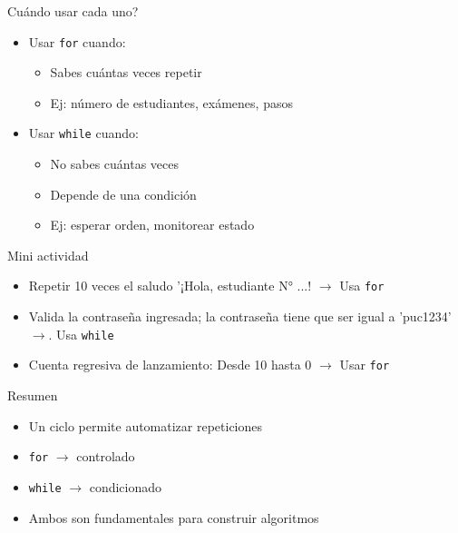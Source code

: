 \documentclass{beamer}
\begin{document}
    \begin{frame}{Cuándo usar cada uno?}
        \begin{itemize}
            \item Usar \texttt{for} cuando:
            \begin{itemize}
                \item Sabes cuántas veces repetir
                \item Ej: número de estudiantes, exámenes, pasos
            \end{itemize}
            \item Usar \texttt{while} cuando:
            \begin{itemize}
                \item No sabes cuántas veces
                \item Depende de una condición
                \item Ej: esperar orden, monitorear estado
            \end{itemize}
        \end{itemize}
    \end{frame}

    \begin{frame}{Mini actividad}
        \begin{itemize}
            \item Repetir 10 veces el saludo '¡Hola, estudiante N° ...! $\rightarrow$ Usa \texttt{for}
            \item Valida la contraseña ingresada; la contraseña tiene que ser igual a 'puc1234' $\rightarrow$. Usa \texttt{while}
            \item Cuenta regresiva de lanzamiento: Desde 10 hasta 0 $\rightarrow$ Usar \texttt{for}
        \end{itemize}
    \end{frame}

    \begin{frame}[fragile,t]{Resumen}
        \begin{itemize}
            \item Un ciclo permite automatizar repeticiones
            \item \texttt{for} $\rightarrow$ controlado
            \item \texttt{while} $\rightarrow$ condicionado
            \item Ambos son fundamentales para construir algoritmos
        \end{itemize}
    \end{frame}
\end{document}
